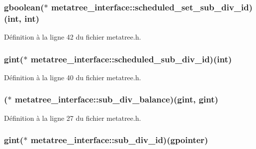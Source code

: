 \subsubsection[{scheduled\_\-set\_\-sub\_\-div\_\-id}]{\setlength{\rightskip}{0pt plus 5cm}gboolean($\ast$  {\bf metatree\_\-interface::scheduled\_\-set\_\-sub\_\-div\_\-id})(int, int)}\label{structmetatree__interface_abe96706f67f980d36cf5e0f13244b9a7}


Définition à la ligne 42 du fichier metatree.h.

\subsubsection[{scheduled\_\-sub\_\-div\_\-id}]{\setlength{\rightskip}{0pt plus 5cm}gint($\ast$  {\bf metatree\_\-interface::scheduled\_\-sub\_\-div\_\-id})(int)}\label{structmetatree__interface_a253410a86799d63980a8da65dbea0255}


Définition à la ligne 40 du fichier metatree.h.

\subsubsection[{sub\_\-div\_\-balance}]{($\ast$  {\bf metatree\_\-interface::sub\_\-div\_\-balance})(gint, gint)}\label{structmetatree__interface_a1b24651778a74f9eebe4dbd59607f5e2}


Définition à la ligne 27 du fichier metatree.h.

\subsubsection[{sub\_\-div\_\-id}]{\setlength{\rightskip}{0pt plus 5cm}gint($\ast$  {\bf metatree\_\-interface::sub\_\-div\_\-id})(gpointer)}\label{structmetatree__interface_ac7971d65e0011bfc0884275d5ff3a0cb}


